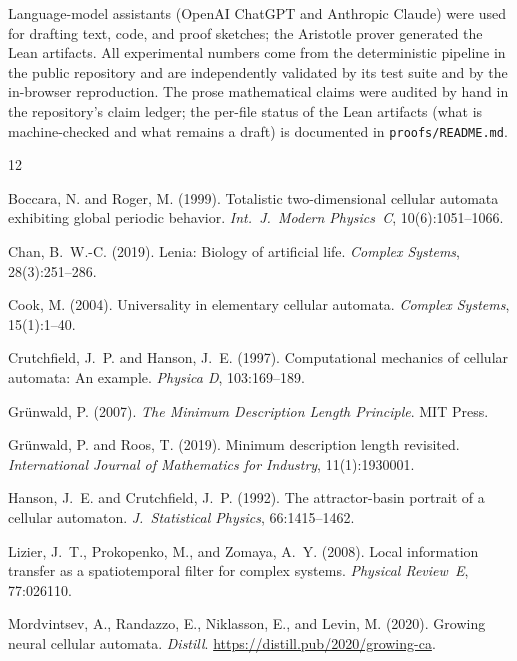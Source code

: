 \documentclass[letterpaper]{article}
\begin{document}
Language-model assistants (OpenAI ChatGPT and Anthropic Claude) were
used for drafting text, code, and proof sketches; the Aristotle prover
generated the Lean artifacts. All experimental numbers come from the
deterministic pipeline in the public repository and are independently
validated by its test suite and by the in-browser reproduction. The
prose mathematical claims were audited by hand in the repository's
claim ledger; the per-file status of the Lean artifacts (what is
machine-checked and what remains a draft) is documented in
\texttt{proofs/README.md}.

\footnotesize

\begin{thebibliography}{12}

Boccara, N. and Roger, M. (1999).
Totalistic two-dimensional cellular automata exhibiting global periodic behavior.
\emph{Int.\ J.\ Modern Physics~C}, 10(6):1051--1066.

Chan, B.~W.-C. (2019).
Lenia: Biology of artificial life.
\emph{Complex Systems}, 28(3):251--286.

Cook, M. (2004).
Universality in elementary cellular automata.
\emph{Complex Systems}, 15(1):1--40.

Crutchfield, J.~P. and Hanson, J.~E. (1997).
Computational mechanics of cellular automata: An example.
\emph{Physica D}, 103:169--189.

Gr{\"u}nwald, P. (2007).
\emph{The Minimum Description Length Principle}.
MIT Press.

Gr{\"u}nwald, P. and Roos, T. (2019).
Minimum description length revisited.
\emph{International Journal of Mathematics for Industry}, 11(1):1930001.

Hanson, J.~E. and Crutchfield, J.~P. (1992).
The attractor-basin portrait of a cellular automaton.
\emph{J.\ Statistical Physics}, 66:1415--1462.

Lizier, J.~T., Prokopenko, M., and Zomaya, A.~Y. (2008).
Local information transfer as a spatiotemporal filter for complex systems.
\emph{Physical Review~E}, 77:026110.

Mordvintsev, A., Randazzo, E., Niklasson, E., and Levin, M. (2020).
Growing neural cellular automata.
\emph{Distill}. \url{https://distill.pub/2020/growing-ca}.


\end{thebibliography}
\end{document}
